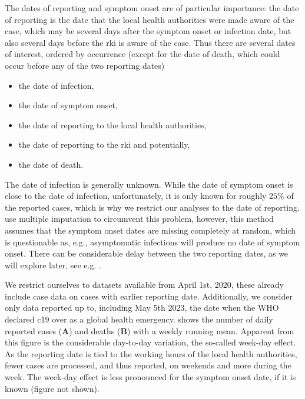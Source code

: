 The dates of reporting and symptom onset are of particular importance: the date of reporting is the date that the local health authorities were made aware of the case, which may be several days after the symptom onset or infection date, but also several days before the \acrshort{rki} is aware of the case. Thus there are several dates of interest, ordered by occurrence (except for the date of death, which could occur before any of the two reporting dates)
\begin{itemize}
    \item the date of infection, 
    \item the date of symptom onset, 
    \item the date of reporting to the local health authorities,
    \item the date of reporting to the \acrshort{rki} and potentially,
    \item the date of death.
\end{itemize}
The date of infection is generally unknown. While the date of symptom onset is close to the date of infection, unfortunately, it is only known for roughly $25\%$ of the reported cases, which is why we restrict our analyses to the date of reporting. \citep{AnDerHeiden2020Schatzung} use multiple imputation to circumvent this problem, however, this method assumes that the symptom onset dates are missing completely at random, which is questionable as, e.g., asymptomatic infections will produce no date of symptom onset. There can be considerable delay between the two reporting dates, as we will explore later, see e.g. .

We restrict ourselves to datasets available from April 1st, 2020, these already include case data on cases with earlier reporting date. Additionally, we consider only data reported up to, including May 5th 2023, the date when the WHO declared \acrshort{c19} over as a global health emergency.  shows the number of daily reported cases (\textbf{A}) and deaths (\textbf{B}) with a weekly running mean. Apparent from this figure is the considerable day-to-day variation, the so-called week-day effect. As the reporting date is tied to the working hours of the local health authorities, fewer cases are processed, and thus reported, on weekends and more during the week. The week-day effect is less pronounced for the symptom onset date, if it is known (figure not shown). 

